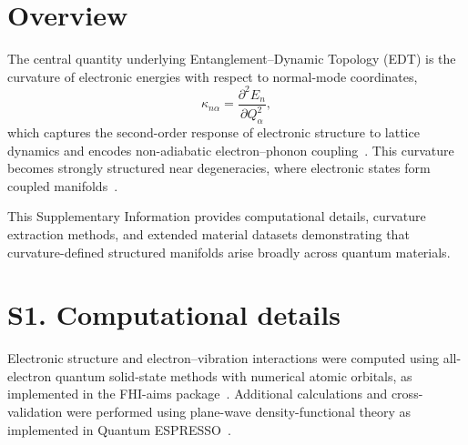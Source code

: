 \documentclass[12pt]{article}
\begin{document}
%
%
%
%

\section*{Overview}

The central quantity underlying Entanglement--Dynamic Topology (EDT) is the curvature of electronic energies with respect to normal-mode coordinates,
\begin{equation}
\kappa_{n\alpha} = \frac{\partial^2 E_n}{\partial Q_\alpha^2},
\end{equation}
which captures the second-order response of electronic structure to lattice dynamics and encodes non-adiabatic electron--phonon coupling~\cite{Giustino2017,Baroni2001}. This curvature becomes strongly structured near degeneracies, where electronic states form coupled manifolds~\cite{Yarkony1996}.

This Supplementary Information provides computational details, curvature extraction methods, and extended material datasets demonstrating that curvature-defined structured manifolds arise broadly across quantum materials.

\section*{S1. Computational details}

Electronic structure and electron--vibration interactions were computed using all-electron quantum solid-state methods with numerical atomic orbitals, as implemented in the FHI-aims package~\cite{Blum2009,FHIaims2020}. Additional calculations and cross-validation were performed using plane-wave density-functional theory as implemented in Quantum ESPRESSO~\cite{Giannozzi2009,Giannozzi2017}.
\end{document}
